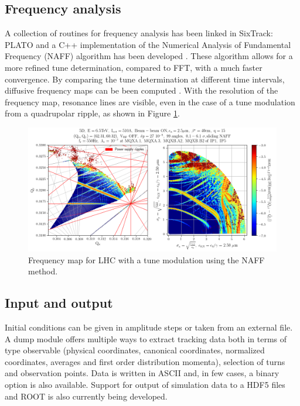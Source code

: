 \documentclass[a4paper,
              ]{jacow}
\begin{document}
\subsection{Frequency analysis}

A collection of routines for frequency analysis has been linked in SixTrack: PLATO \cite{plato} and a C++ implementation of the Numerical Analysis of Fundamental Frequency (NAFF) algorithm has been developed \cite{naff}. These algorithm allows for a more refined tune determination, compared to FFT, with a much faster convergence. By comparing the tune determination at different time intervals,  diffusive frequency maps can be been computed \cite{laskar}. With the resolution of the frequency map, resonance lines are visible, even in the case of a tune modulation from a quadrupolar ripple, as shown in Figure \ref{fig:fma}.

\begin{figure}[!tbh]
\centering
 \includegraphics[width=\textwidth]{FMA.png}
 \caption{Frequency map for LHC with a tune modulation using the NAFF method.}
 \label{fig:fma}
\end{figure}

\subsection{Input and output}

Initial conditions can be given in amplitude steps or taken from an external file.
A dump module offers multiple ways to extract tracking data both in terms of type observable (physical coordinates, canonical coordinates, normalized coordinates, averages and first order distribution momenta), selection of turns and observation points. Data is written in ASCII and, in few cases, a binary option is also available. Support for output of simulation data to a HDF5 \cite{hdf5} files and ROOT \cite{root} is also currently being developed.
\end{document}
